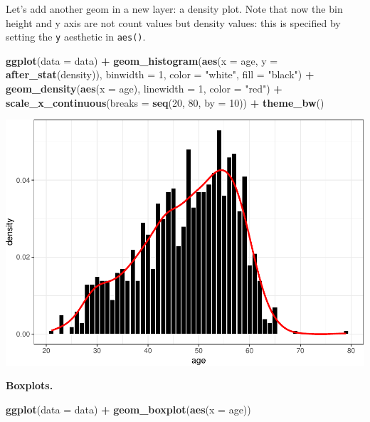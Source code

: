 \documentclass[
]{book}
\newenvironment{Shaded}{\begin{snugshade}}{\end{snugshade}}
\newcommand{\AttributeTok}[1]{\textcolor[rgb]{0.13,0.29,0.53}{#1}}
\newcommand{\DecValTok}[1]{\textcolor[rgb]{0.00,0.00,0.81}{#1}}
\newcommand{\FunctionTok}[1]{\textcolor[rgb]{0.13,0.29,0.53}{\textbf{#1}}}
\newcommand{\NormalTok}[1]{#1}
\newcommand{\SpecialCharTok}[1]{\textcolor[rgb]{0.81,0.36,0.00}{\textbf{#1}}}
\newcommand{\StringTok}[1]{\textcolor[rgb]{0.31,0.60,0.02}{#1}}
\begin{document}
Let's add another geom in a new layer: a density plot. Note that now the bin height and y axis are not count values but density values: this is specified by setting the \texttt{y} aesthetic in \texttt{aes()}.

\begin{Shaded}
\begin{Highlighting}[]
\FunctionTok{ggplot}\NormalTok{(}\AttributeTok{data =}\NormalTok{ data) }\SpecialCharTok{+}
  \FunctionTok{geom\_histogram}\NormalTok{(}\FunctionTok{aes}\NormalTok{(}\AttributeTok{x =}\NormalTok{ age, }\AttributeTok{y =} \FunctionTok{after\_stat}\NormalTok{(density)), }\AttributeTok{binwidth =} \DecValTok{1}\NormalTok{,}
                 \AttributeTok{color =} \StringTok{"white"}\NormalTok{, }\AttributeTok{fill =} \StringTok{"black"}\NormalTok{) }\SpecialCharTok{+}
  \FunctionTok{geom\_density}\NormalTok{(}\FunctionTok{aes}\NormalTok{(}\AttributeTok{x =}\NormalTok{ age), }\AttributeTok{linewidth =} \DecValTok{1}\NormalTok{, }\AttributeTok{color =} \StringTok{"red"}\NormalTok{) }\SpecialCharTok{+}
  \FunctionTok{scale\_x\_continuous}\NormalTok{(}\AttributeTok{breaks =} \FunctionTok{seq}\NormalTok{(}\DecValTok{20}\NormalTok{, }\DecValTok{80}\NormalTok{, }\AttributeTok{by =} \DecValTok{10}\NormalTok{)) }\SpecialCharTok{+}
  \FunctionTok{theme\_bw}\NormalTok{()}
\end{Highlighting}
\end{Shaded}

\includegraphics{R-for-social-research-and-business-analytics_files/figure-latex/unnamed-chunk-22-1.pdf}

\textbf{Boxplots.}

\begin{Shaded}
\begin{Highlighting}[]
\FunctionTok{ggplot}\NormalTok{(}\AttributeTok{data =}\NormalTok{ data) }\SpecialCharTok{+}
  \FunctionTok{geom\_boxplot}\NormalTok{(}\FunctionTok{aes}\NormalTok{(}\AttributeTok{x =}\NormalTok{ age))}
\end{Highlighting}
\end{Shaded}
\end{document}
